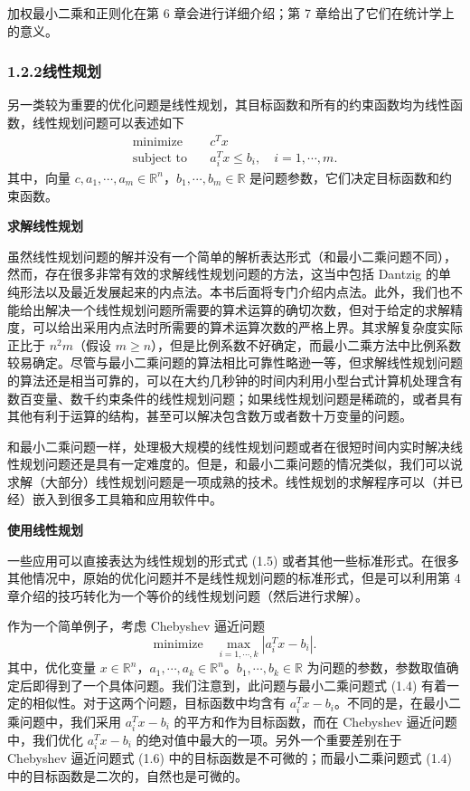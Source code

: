 \documentclass[UTF8,12pt,a4paper,fontset=fandol]{ctexart}
\begin{document}
加权最小二乘和正则化在第 6 章会进行详细介绍；第 7 章给出了它们在统计学上的意义。

\subsubsection*{1.2.2\quad 线性规划}

另一类较为重要的优化问题是线性规划，其目标函数和所有的约束函数均为线性函数，线性规划问题可以表述如下
\begin{equation}
\begin{aligned}
  \text{minimize}\quad & c^Tx\\
  \text{subject to}\quad & a_i^Tx\le b_i,\quad i=1,\cdots,m.
\end{aligned}
\tag{1.5}
\end{equation}
其中，向量 $c,a_1,\cdots,a_m\in\mathbb{R}^n$，$b_1,\cdots,b_m\in\mathbb{R}$ 是问题参数，它们决定目标函数和约束函数。

\noindent\textbf{求解线性规划}

虽然线性规划问题的解并没有一个简单的解析表达形式（和最小二乘问题不同），然而，存在很多非常有效的求解线性规划问题的方法，这当中包括 Dantzig 的单纯形法以及最近发展起来的内点法。本书后面将专门介绍内点法。此外，我们也不能给出解决一个线性规划问题所需要的算术运算的确切次数，但对于给定的求解精度，可以给出采用内点法时所需要的算术运算次数的严格上界。其求解复杂度实际正比于 $n^2m$（假设 $m\ge n$），但是比例系数不好确定，而最小二乘方法中比例系数较易确定。尽管与最小二乘问题的算法相比可靠性略逊一等，但求解线性规划问题的算法还是相当可靠的，可以在大约几秒钟的时间内利用小型台式计算机处理含有数百变量、数千约束条件的线性规划问题；如果线性规划问题是稀疏的，或者具有其他有利于运算的结构，甚至可以解决包含数万或者数十万变量的问题。

和最小二乘问题一样，处理极大规模的线性规划问题或者在很短时间内实时解决线性规划问题还是具有一定难度的。但是，和最小二乘问题的情况类似，我们可以说求解（大部分）线性规划问题是一项成熟的技术。线性规划的求解程序可以（并已经）嵌入到很多工具箱和应用软件中。

\noindent\textbf{使用线性规划}

一些应用可以直接表达为线性规划的形式式 (1.5) 或者其他一些标准形式。在很多其他情况中，原始的优化问题并不是线性规划问题的标准形式，但是可以利用第 4 章介绍的技巧转化为一个等价的线性规划问题（然后进行求解）。

作为一个简单例子，考虑 Chebyshev 逼近问题
\begin{equation}
  \text{minimize}\quad \max_{i=1,\cdots,k}|a_i^Tx-b_i|.
\tag{1.6}
\end{equation}
其中，优化变量 $x\in\mathbb{R}^n$，$a_1,\cdots,a_k\in\mathbb{R}^n$。$b_1,\cdots,b_k\in\mathbb{R}$ 为问题的参数，参数取值确定后即得到了一个具体问题。我们注意到，此问题与最小二乘问题式 (1.4) 有着一定的相似性。对于这两个问题，目标函数中均含有 $a_i^Tx-b_i$。不同的是，在最小二乘问题中，我们采用 $a_i^Tx-b_i$ 的平方和作为目标函数，而在 Chebyshev 逼近问题中，我们优化 $a_i^Tx-b_i$ 的绝对值中最大的一项。另外一个重要差别在于 Chebyshev 逼近问题式 (1.6) 中的目标函数是不可微的；而最小二乘问题式 (1.4) 中的目标函数是二次的，自然也是可微的。
\end{document}
